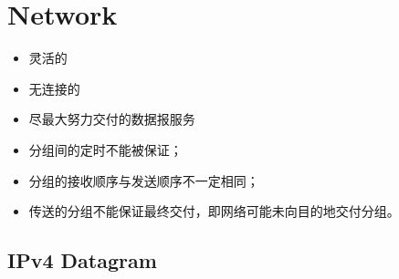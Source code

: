 \documentclass[a4paper]{report}
\begin{document}
\chapter{Network}
\begin{itemize}
  \item 灵活的
  \item 无连接的
  \item 尽最大努力交付的数据报服务
\end{itemize}

\begin{itemize}
  \item 分组间的定时不能被保证；
  \item 分组的接收顺序与发送顺序不一定相同；
  \item 传送的分组不能保证最终交付，即网络可能未向目的地交付分组。
\end{itemize}


\section{IPv4 Datagram}
\end{document}
